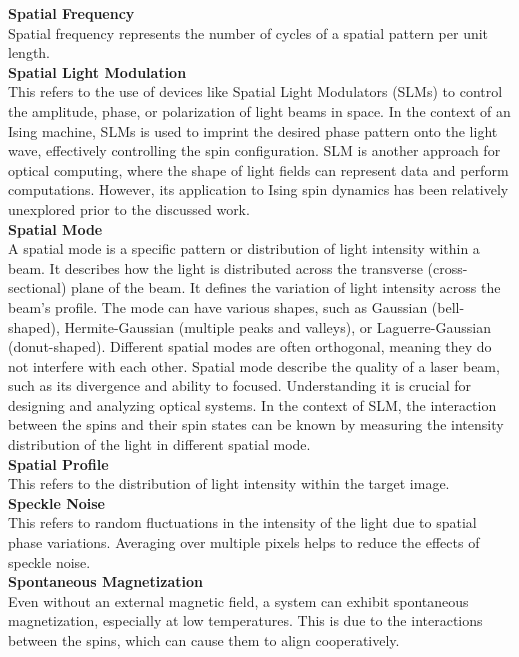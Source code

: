\textbf{Spatial Frequency} \\
Spatial frequency represents the number of cycles of a spatial pattern per unit length. \\

\textbf{Spatial Light Modulation} \\ 
This refers to the use of devices like Spatial Light Modulators (SLMs) to control the amplitude, phase, or polarization of light beams in space. In the context of an Ising machine, SLMs is used to imprint the desired phase pattern onto the light wave, effectively controlling the spin configuration. SLM is another approach for optical computing, where the shape of light fields can represent data and perform computations. However, its application to Ising spin dynamics has been relatively unexplored prior to the discussed work.\\

\textbf{Spatial Mode} \\
A spatial mode is a specific pattern or distribution of light intensity within a beam. It describes how the light is distributed across the transverse (cross-sectional) plane of the beam. It defines the variation of light intensity across the beam's profile. The mode can have various shapes, such as Gaussian (bell-shaped), Hermite-Gaussian (multiple peaks and valleys), or Laguerre-Gaussian (donut-shaped). Different spatial modes are often orthogonal, meaning they do not interfere with each other. Spatial mode describe the quality of a laser beam, such as its divergence and ability to focused. Understanding it is crucial for designing and analyzing optical systems. In the context of SLM, the interaction between the spins and their spin states can be known by measuring the intensity distribution of the light in different spatial mode.\\

\textbf{Spatial Profile} \\
This refers to the distribution of light intensity within the target image. \\

\textbf{Speckle Noise}\\
This refers to random fluctuations in the intensity of the light due to spatial phase variations. Averaging over multiple pixels helps to reduce the effects of speckle noise.\\

\textbf{Spontaneous Magnetization} \\
Even without an external magnetic field, a system can exhibit spontaneous magnetization, especially at low temperatures. This is due to the interactions between the spins, which can cause them to align cooperatively. \\

